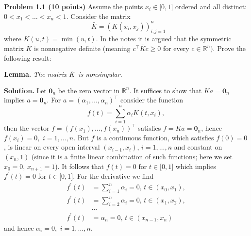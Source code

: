 \documentclass[11pt,twoside]{article}%
\theoremstyle{change}
\newenvironment{quote-env}{\begin{quote}\sffamily }{\end{quote}}
\newenvironment{mycomments-env}[1][Mycomments]{\textbf{#1.} \begin{quote-env} }{ \end{quote-env}  \ \rule{0.5em}{0.5em}}
\begin{document}
\textbf{\bigskip Problem 1.1 (10 points) }Assume the points $x_{i}\in
\lbrack0,1]$ ordered and all distinct: $0<x_{1}<\ldots<x_{n}<1$. Consider the
matrix
\[
\text{ }\bar{K}=\left(  K\left(  x_{i},x_{j}\right)  \right)  _{i,j=1}^{n}%
\]
where $K\left(  u,t\right)  =\min(u,t)$. In the notes it is argued that the
symmetric matrix $\bar{K}$ is nonnegative definite (meaning $c^{\top}\bar
{K}c\geq0$ for every $c\in\mathbb{R}^{n})$. Prove the following result:

\textbf{Lemma.} \textit{The matrix }$\bar{K}$\textit{\ is nonsingular.}%

\begin{mycomments}%


\begin{mycomments-env}
\textbf{Solution. }Let $\mathbf{0}_{n}$ be the zero vector in $\mathbb{R}^{n}
$. It suffices to show that $Ka=\mathbf{0}_{n}$ implies $a=\mathbf{0}_{n}$.
For $a=\left(  \alpha_{1},\ldots,\alpha_{n}\right)  ^{\top}$ consider the
function
\[
f(t)=\sum_{i=1}^{n}\alpha_{i}K\left(  t,x_{i}\right)  ,
\]
then the vector $\bar{f}=\left(  f(x_{1}),\ldots,f(x_{n})\right)  ^{\top}$
satisfies $\bar{f}=Ka=\mathbf{0}_{n}$, hence $f(x_{i})=0,$ $i=1,\ldots,n$. But
$f$ is a continuous function, which satisfies $f(0)=0$, is linear on every
open interval $(x_{i-1},x_{i})$, $i=1,\ldots,n$ and constant on $(x_{n},1)$
(since it is a finite linear combination of such functions; here we set
$x_{0}=0$, $x_{n+1}=1$). It follows that $f(t)=0$ for $t\in\lbrack0,1]$ which
implies $f^{\prime}(t)=0$ for $t\in\lbrack0,1]$. For the derivative we find
\begin{align*}
f^{\prime}(t)  & =\sum_{i=1}^{n}\alpha_{i}=0\text{, }t\in(x_{0},x_{1}),\\
f^{\prime}(t)  & =\sum_{i=2}^{n}\alpha_{i}=0\text{, }t\in(x_{1},x_{2}),\\
& \ldots\\
f^{\prime}(t)  & =\alpha_{n}=0\text{, }t\in(x_{n-1},x_{n})
\end{align*}
and hence $\alpha_{i}=0,$ $i=1,\ldots,n$.
\end{mycomments-env}%

\end{mycomments}%


\bigskip
\end{document}
